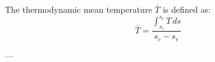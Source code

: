 The thermodynamic mean temperature \( \bar{T} \) is defined as:  
\[
\bar{T} = \frac{\int_{s_e}^{s_c} T \, ds}{s_c - s_e}
\]  

---